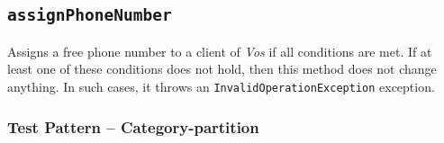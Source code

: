 %
%
%
\subsection{\texttt{assignPhoneNumber}}
\label{sec:methods.assignPhoneNumber}
Assigns a free phone number to a client of \textit{Vos} if all conditions are
met. If at least one of these conditions does not hold, then this method does
not change anything. In such cases, it throws an
\texttt{InvalidOperationException} exception.

\subsubsection{Test Pattern -- Category-partition}
\label{sec:methods.assignPhoneNumber.pattern}

